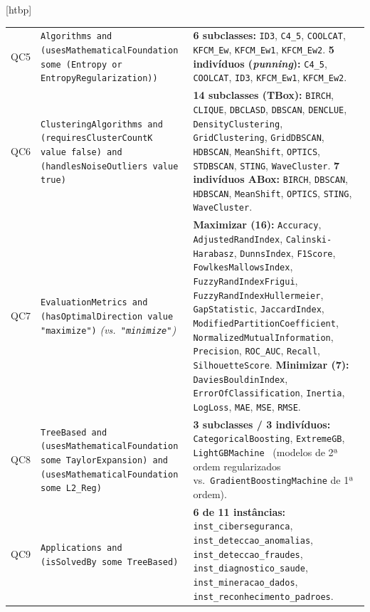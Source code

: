 \documentclass[11pt,a4paper]{article}
\makeatletter
\newcommand{\onto}[1]{\texttt{#1}}
\newcounter{quadro}
\newenvironment{quadro}{\@float{quadro}}{\end@float}
\makeatother
\begin{document}
\begin{quadro}[htbp]
\begin{tabularx}{\textwidth}{@{}p{0.8cm}>{\raggedright\arraybackslash}p{5.8cm}>{\raggedright\arraybackslash}X@{}}
\addlinespace[4pt]
QC5 & \onto{Algorithms and (usesMathematicalFoundation some (Entropy or EntropyRegularization))} & \textbf{6 subclasses:} \onto{ID3}, \onto{C4\_5}, \onto{COOLCAT}, \onto{KFCM\_Ew}, \onto{KFCM\_Ew1}, \onto{KFCM\_Ew2}. \newline \textbf{5 indivíduos (\emph{punning}):} \onto{C4\_5}, \onto{COOLCAT}, \onto{ID3}, \onto{KFCM\_Ew1}, \onto{KFCM\_Ew2}. \\
\addlinespace[4pt]
QC6 & \onto{ClusteringAlgorithms and (requiresClusterCountK value false) and (handlesNoiseOutliers value true)} & \textbf{14 subclasses (TBox):} \onto{BIRCH}, \onto{CLIQUE}, \onto{DBCLASD}, \onto{DBSCAN}, \onto{DENCLUE}, \onto{DensityClustering}, \onto{GridClustering}, \onto{GridDBSCAN}, \onto{HDBSCAN}, \onto{MeanShift}, \onto{OPTICS}, \onto{STDBSCAN}, \onto{STING}, \onto{WaveCluster}. \newline \textbf{7 indivíduos ABox:} \onto{BIRCH}, \onto{DBSCAN}, \onto{HDBSCAN}, \onto{MeanShift}, \onto{OPTICS}, \onto{STING}, \onto{WaveCluster}. \\
\addlinespace[4pt]
QC7 & \onto{EvaluationMetrics and (hasOptimalDirection value "maximize")} \emph{(vs.\ \onto{"minimize"})} & \textbf{Maximizar (16):} \onto{Accuracy}, \onto{AdjustedRandIndex}, \onto{Calinski-Harabasz}, \onto{DunnsIndex}, \onto{F1Score}, \onto{FowlkesMallowsIndex}, \onto{FuzzyRandIndexFrigui}, \onto{FuzzyRandIndexHullermeier}, \onto{GapStatistic}, \onto{JaccardIndex}, \onto{ModifiedPartitionCoefficient}, \onto{NormalizedMutualInformation}, \onto{Precision}, \onto{ROC\_AUC}, \onto{Recall}, \onto{SilhouetteScore}. \newline \textbf{Minimizar (7):} \onto{DaviesBouldinIndex}, \onto{ErrorOfClassification}, \onto{Inertia}, \onto{LogLoss}, \onto{MAE}, \onto{MSE}, \onto{RMSE}. \\
\addlinespace[4pt]
QC8 & \onto{TreeBased and (usesMathematicalFoundation some TaylorExpansion) and (usesMathematicalFoundation some L2\_Reg)} & \textbf{3 subclasses / 3 indivíduos:} \onto{CategoricalBoosting}, \onto{ExtremeGB}, \onto{LightGBMachine}~\cite{bentejac2021comparative} (modelos de 2ª ordem regularizados vs.\ \onto{GradientBoostingMachine} de 1ª ordem). \\
\addlinespace[4pt]
QC9 & \onto{Applications and (isSolvedBy some TreeBased)} & \textbf{6 de 11 instâncias:} \onto{inst\_ciberseguranca}, \onto{inst\_deteccao\_anomalias}, \onto{inst\_deteccao\_fraudes}, \onto{inst\_diagnostico\_saude}, \onto{inst\_mineracao\_dados}, \onto{inst\_reconhecimento\_padroes}. \\
\bottomrule
\end{tabularx}
\end{quadro}
\end{document}
